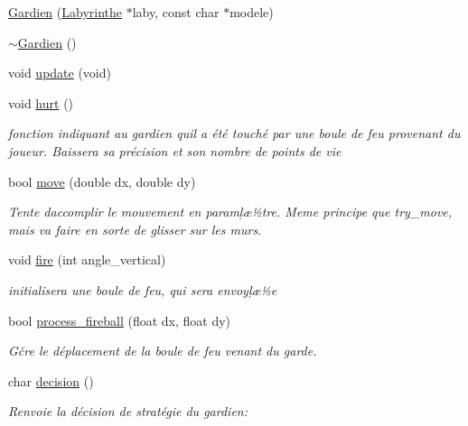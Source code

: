 \begin{DoxyCompactItemize}
\item 
\hyperlink{classGardien_afc1e450fa7ad919d801475b34ced6e8d}{Gardien} (\hyperlink{classLabyrinthe}{Labyrinthe} $\ast$laby, const char $\ast$modele)
\item 
\hyperlink{classGardien_afef6202d924fef9d882bb40dfc4ac9fb}{$\sim$\+Gardien} ()
\item 
void \hyperlink{classGardien_aed498f0d6bbb526e0373a914ba6bf9aa}{update} (void)
\item 
void \hyperlink{classGardien_ac4ba490e309de80c1449fc5baef90390}{hurt} ()
\begin{DoxyCompactList}\small\item\em fonction indiquant au gardien qu\textquotesingle{}il a été touché par une boule de feu provenant du joueur. Baissera sa précision et son nombre de points de vie \end{DoxyCompactList}\item 
bool \hyperlink{classGardien_a1de6511bda736ad456457c51fa9d8d68}{move} (double dx, double dy)
\begin{DoxyCompactList}\small\item\em Tente d\textquotesingle{}accomplir le mouvement en paramļæ½tre. Meme principe que try\+\_\+move, mais va faire en sorte de glisser sur les murs. \end{DoxyCompactList}\item 
void \hyperlink{classGardien_aa0e2e0fbdca75ddc5e0501b5498d5f55}{fire} (int angle\+\_\+vertical)
\begin{DoxyCompactList}\small\item\em initialisera une boule de feu, qui sera envoyļæ½e \end{DoxyCompactList}\item 
bool \hyperlink{classGardien_ad1d0f6aca8be28477e16dae7a30301b8}{process\+\_\+fireball} (float dx, float dy)
\begin{DoxyCompactList}\small\item\em Gčre le déplacement de la boule de feu venant du garde. \end{DoxyCompactList}\item 
char \hyperlink{classGardien_ab840e41dd18ea6bd8306fa15bb611372}{decision} ()
\begin{DoxyCompactList}\small\item\em Renvoie la décision de stratégie du gardien\+: \end{DoxyCompactList}\end{DoxyCompactItemize}
